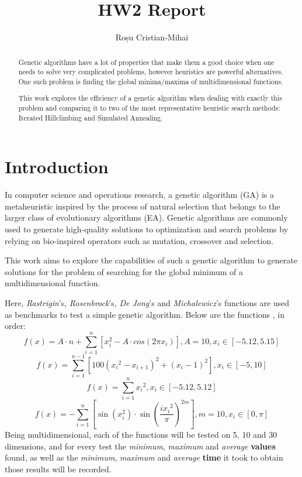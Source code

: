 \documentclass{article}
\author{Roșu Cristian-Mihai}
\title{HW2 Report}
\begin{document}

\maketitle

\begin{abstract}
Genetic algorithms have a lot of properties that make them a good choice when 
one needs to solve very complicated problems, however heuristics are 
powerful alternatives. One such problem is finding the global minima/maxima 
of multidimensional functions.

This work explores the efficiency of a genetic algorithm when dealing with
exactly this problem and comparing it to two of the most representative
heuristic search methods: Iterated Hillclimbing and Simulated Annealing.
\end{abstract}

\section{Introduction}
In computer science and operations research, a genetic algorithm (GA) is a 
metaheuristic inspired by the process of natural selection that belongs to 
the larger class of evolutionary algorithms (EA). Genetic algorithms are 
commonly used to generate high-quality solutions to optimization and search 
problems by relying on bio-inspired operators such as mutation, crossover and 
selection. \cite{ga}

This work aims to explore the capabilities of such a genetic algorithm to
generate solutions for the problem of searching for the global minimum of
a multidimensional function.

Here, \textit{Rastrigin}'s, \textit{Rosenbrock}'s, \textit{De Jong}'s and 
\textit{Michalewicz}'s functions are used as benchmarks to test a simple
genetic algorithm. Below are the functions \cite{functions}, in order:
$$ f(x) = A \cdot n + \sum_{i=1}^n \left[ x_i^2 - A \cdot cos(2 \pi x_i) \right], A = 10, x_i \in \left[ -5.12, 5.15 \right] $$
$$ f(x) = \sum_{i=1}^{n-1} \left[ 100({x_i}^2-x_{i+1})^2+(x_i-1)^2 \right], x_i \in \left[ -5, 10 \right]$$
$$ f(x) = \sum_{i=1}^n {x_i}^2, x_i \in \left[ -5.12, 5.12 \right] $$
$$ f(x) = - \sum_{i=1}^n \left[ \sin(x_i^2) \cdot \sin \left( \frac{i{x_i}^2}{\pi} \right)^{2m} \right], m = 10, x_i \in \left[ 0, \pi \right] $$
Being multidimensional, each of the functions will be tested on 5, 10 and 30 
dimensions, and for every test the \textsl{minimum}, \textsl{maximum} and 
\textsl{average} \textbf{values} found, as well as the \textsl{minimum}, 
\textsl{maximum} and \textsl{average} \textbf{time} it took to obtain those 
results will be recorded.
\end{document}
